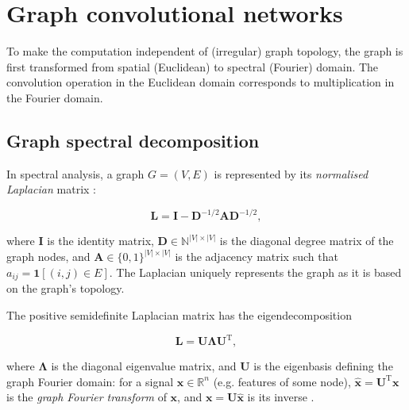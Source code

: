 

\section{Graph convolutional networks}
\label{training-gcn}

To make the computation independent of (irregular) graph topology, the graph is first transformed from spatial (Euclidean) to spectral (Fourier) domain. The convolution operation in the Euclidean domain corresponds to multiplication in the Fourier domain.

\subsection{Graph spectral decomposition}

In spectral analysis, a graph $G = (V, E)$ is represented by its \textit{normalised Laplacian} matrix \cite{defferrard2016convolutional}: 

\begin{equation}
    \mathbf{L} = \mathbf{I} - \mathbf{D}^{-1/2}\mathbf{A}\mathbf{D}^{-1/2},
\end{equation}

where $\mathbf{I}$ is the identity matrix, $\mathbf{D} \in \mathbb{N}^{|V| \times |V|}$ is the diagonal degree matrix of the graph nodes, and $\mathbf{A} \in \{0, 1\}^{|V| \times |V|}$ is the adjacency matrix such that $a_{ij} = \mathbf{1}[(i, j) \in E]$. The Laplacian uniquely represents the graph as it is based on the graph's topology.

The positive semidefinite Laplacian matrix has the eigendecomposition

\begin{equation}
    \mathbf{L} = \mathbf{U\Lambda U}^\mathrm{T},
\end{equation}

where $\mathbf{\Lambda}$ is the diagonal eigenvalue matrix, and $\mathbf{U}$ is the eigenbasis defining the graph Fourier domain: for a signal $\mathbf{x} \in \mathbb{R}^{n}$ (e.g. features of some node), $\mathbf{\hat{x}} = \mathbf{U}^\mathrm{T}\mathbf{x}$ is the \textit{graph Fourier transform} of $\mathbf{x}$, and $\mathbf{x} = \mathbf{U}\mathbf{\hat{x}}$ is its inverse \cite{wu2019simplifying}.

